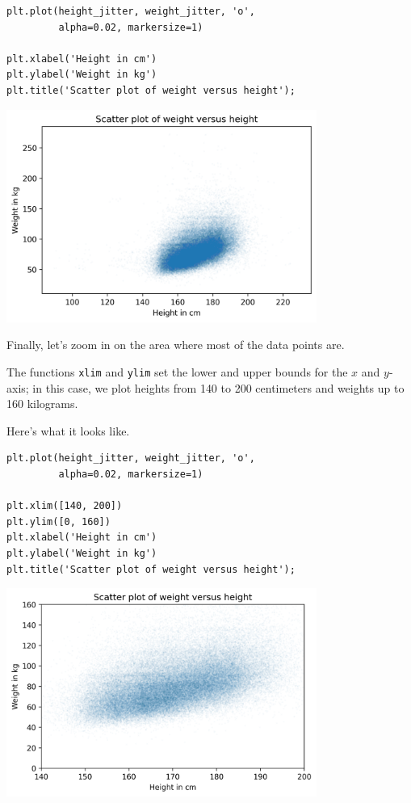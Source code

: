 \begin{lstlisting}[]
plt.plot(height_jitter, weight_jitter, 'o', 
         alpha=0.02, markersize=1)

plt.xlabel('Height in cm')
plt.ylabel('Weight in kg')
plt.title('Scatter plot of weight versus height');
\end{lstlisting}

\begin{center}
\includegraphics[width=4in]{chapters/09_relationships_files/09_relationships_23_0.png}
\end{center}

Finally, let's zoom in on the area where most of the data points are.

The functions \passthrough{\lstinline!xlim!} and
\passthrough{\lstinline!ylim!} set the lower and upper bounds for the
\(x\) and \(y\)-axis; in this case, we plot heights from 140 to 200
centimeters and weights up to 160 kilograms.

Here's what it looks like.

\begin{lstlisting}[]
plt.plot(height_jitter, weight_jitter, 'o', 
         alpha=0.02, markersize=1)

plt.xlim([140, 200])
plt.ylim([0, 160])
plt.xlabel('Height in cm')
plt.ylabel('Weight in kg')
plt.title('Scatter plot of weight versus height');
\end{lstlisting}

\begin{center}
\includegraphics[width=4in]{chapters/09_relationships_files/09_relationships_25_0.png}
\end{center}

